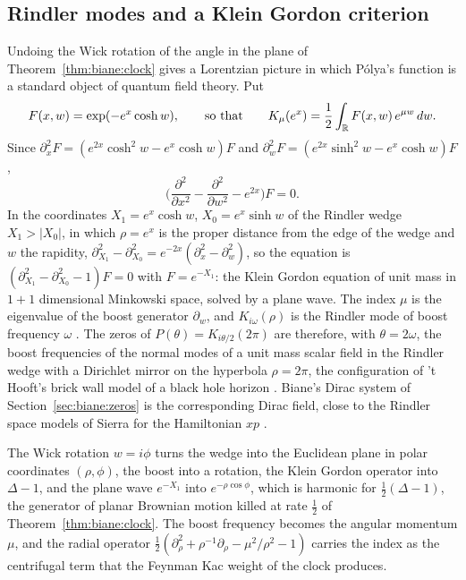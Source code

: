 \subsection{Rindler modes and a Klein Gordon criterion}\label{sec:biane:kg}

Undoing the Wick rotation of the angle in the plane of Theorem~\ref{thm:biane:clock} gives a Lorentzian picture in which P\'olya's function is a standard object of quantum field theory. Put
\[
F(x,w)=\exp(-e^x\cosh w),\qquad\text{so that}\qquad K_\mu(e^x)=\frac12\int_{\mathbb{R}}F(x,w)\,e^{\mu w}\,dw .
\]
Since $\partial_x^2F=(e^{2x}\cosh^2w-e^x\cosh w)F$ and $\partial_w^2F=(e^{2x}\sinh^2w-e^x\cosh w)F$,
\[
\Big(\frac{\partial^2}{\partial x^2}-\frac{\partial^2}{\partial w^2}-e^{2x}\Big)F=0 .
\]
In the coordinates $X_1=e^x\cosh w$, $X_0=e^x\sinh w$ of the Rindler wedge $X_1>|X_0|$, in which $\rho=e^x$ is the proper distance from the edge of the wedge and $w$ the rapidity, $\partial_{X_1}^2-\partial_{X_0}^2=e^{-2x}(\partial_x^2-\partial_w^2)$, so the equation is $(\partial_{X_1}^2-\partial_{X_0}^2-1)F=0$ with $F=e^{-X_1}$: the Klein Gordon equation of unit mass in $1+1$ dimensional Minkowski space, solved by a plane wave. The index $\mu$ is the eigenvalue of the boost generator $\partial_w$, and $K_{i\omega}(\rho)$ is the Rindler mode of boost frequency $\omega$ \cite{Fulling73}. The zeros of $P(\theta)=K_{i\theta/2}(2\pi)$ are therefore, with $\theta=2\omega$, the boost frequencies of the normal modes of a unit mass scalar field in the Rindler wedge with a Dirichlet mirror on the hyperbola $\rho=2\pi$, the configuration of 't Hooft's brick wall model of a black hole horizon \cite{tHooft85}. Biane's Dirac system of Section~\ref{sec:biane:zeros} is the corresponding Dirac field, close to the Rindler space models of Sierra for the Hamiltonian $xp$ \cite{Sierra14}.

The Wick rotation $w=i\phi$ turns the wedge into the Euclidean plane in polar coordinates $(\rho,\phi)$, the boost into a rotation, the Klein Gordon operator into $\Delta-1$, and the plane wave $e^{-X_1}$ into $e^{-\rho\cos\phi}$, which is harmonic for $\frac12(\Delta-1)$, the generator of planar Brownian motion killed at rate $\frac12$ of Theorem~\ref{thm:biane:clock}. The boost frequency becomes the angular momentum $\mu$, and the radial operator $\frac12(\partial_\rho^2+\rho^{-1}\partial_\rho-\mu^2/\rho^2-1)$ carries the index as the centrifugal term that the Feynman Kac weight of the clock produces.

